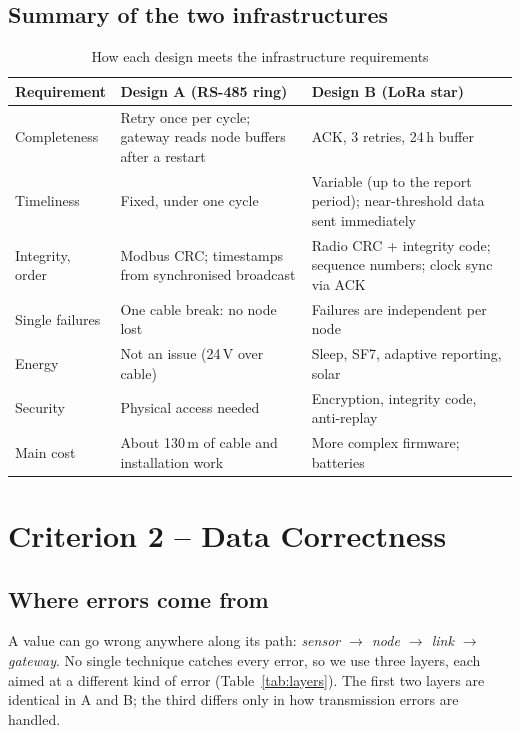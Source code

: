 \documentclass[11pt,a4paper]{report}
\begin{document}
\section{Summary of the two infrastructures}
\begin{table}[htbp]
\centering
\caption{How each design meets the infrastructure requirements}\label{tab:infra}
\small
\begin{tabularx}{\textwidth}{>{\raggedright\arraybackslash}p{2.8cm} Y Y}
\toprule
\textbf{Requirement} & \textbf{Design A (RS-485 ring)} & \textbf{Design B (LoRa star)}\\
\midrule
Completeness & Retry once per cycle; gateway reads node buffers after a restart & ACK, 3 retries, 24\,h buffer\\
Timeliness & Fixed, under one cycle & Variable (up to the report period); near-threshold data sent immediately\\
Integrity, order & Modbus CRC; timestamps from synchronised broadcast & Radio CRC + integrity code; sequence numbers; clock sync via ACK\\
Single failures & One cable break: no node lost & Failures are independent per node\\
Energy & Not an issue (24\,V over cable) & Sleep, SF7, adaptive reporting, solar\\
Security & Physical access needed & Encryption, integrity code, anti-replay\\
Main cost & About 130\,m of cable and installation work & More complex firmware; batteries\\
\bottomrule
\end{tabularx}
\end{table}

\chapter{Criterion 2 -- Data Correctness}\label{ch:correct}

\section{Where errors come from}
A value can go wrong anywhere along its path: \emph{sensor $\to$ node $\to$ link $\to$ gateway}. No single technique catches every error, so we use three layers, each aimed at a different kind of error (Table~\ref{tab:layers}). The first two layers are identical in A and B; the third differs only in how transmission errors are handled.
\end{document}
